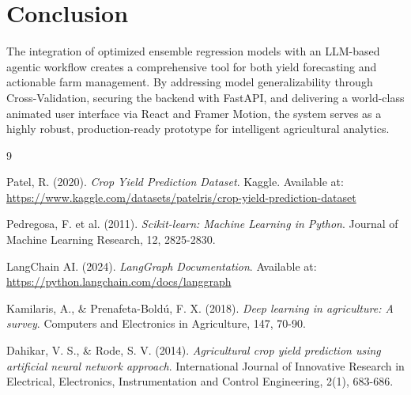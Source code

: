 \documentclass[12pt,a4paper]{article}
\begin{document}
\section{Conclusion}
The integration of optimized ensemble regression models with an LLM-based agentic workflow creates a comprehensive tool for both yield forecasting and actionable farm management. By addressing model generalizability through Cross-Validation, securing the backend with FastAPI, and delivering a world-class animated user interface via React and Framer Motion, the system serves as a highly robust, production-ready prototype for intelligent agricultural analytics.

\begin{thebibliography}{9}

Patel, R. (2020). \textit{Crop Yield Prediction Dataset}. Kaggle. Available at: \url{https://www.kaggle.com/datasets/patelris/crop-yield-prediction-dataset}

Pedregosa, F. et al. (2011). \textit{Scikit-learn: Machine Learning in Python}. Journal of Machine Learning Research, 12, 2825-2830.

LangChain AI. (2024). \textit{LangGraph Documentation}. Available at: \url{https://python.langchain.com/docs/langgraph}

Kamilaris, A., \& Prenafeta-Boldú, F. X. (2018). \textit{Deep learning in agriculture: A survey}. Computers and Electronics in Agriculture, 147, 70-90.

Dahikar, V. S., \& Rode, S. V. (2014). \textit{Agricultural crop yield prediction using artificial neural network approach}. International Journal of Innovative Research in Electrical, Electronics, Instrumentation and Control Engineering, 2(1), 683-686.

\end{thebibliography}
\end{document}
